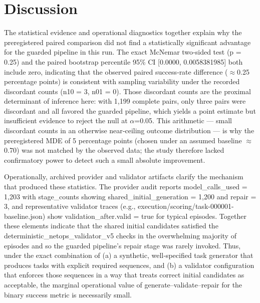 \documentclass[conference]{IEEEtran}
\begin{document}
\section{Discussion}
The statistical evidence and operational diagnostics together explain why the preregistered paired comparison did not find a statistically significant advantage for the guarded pipeline in this run. The exact McNemar two‑sided test (p = 0.25) and the paired bootstrap percentile 95\% CI [0.0000, 0.0058381985] both include zero, indicating that the observed paired success‑rate difference (\ensuremath{\approx}0.25 percentage points) is consistent with sampling variability under the recorded discordant counts (n10 = 3, n01 = 0). Those discordant counts are the proximal determinant of inference here: with 1,199 complete pairs, only three pairs were discordant and all favored the guarded pipeline, which yields a point estimate but insufficient evidence to reject the null at \ensuremath{\alpha}=0.05. This arithmetic --- small discordant counts in an otherwise near‑ceiling outcome distribution --- is why the preregistered MDE of 5 percentage points (chosen under an assumed baseline \ensuremath{\approx}0.70) was not matched by the observed data; the study therefore lacked confirmatory power to detect such a small absolute improvement.

Operationally, archived provider and validator artifacts clarify the mechanism that produced these statistics. The provider audit reports model\_calls\_used = 1,203 with stage\_counts showing shared\_initial\_generation = 1,200 and repair = 3, and representative validator traces (e.g., execution/scoring/task-000001-baseline.json) show validation\_after.valid = true for typical episodes. Together these elements indicate that the shared initial candidates satisfied the deterministic\_netops\_validator\_v5 checks in the overwhelming majority of episodes and so the guarded pipeline's repair stage was rarely invoked. Thus, under the exact combination of (a) a synthetic, well‑specified task generator that produces tasks with explicit required sequences, and (b) a validator configuration that enforces those sequences in a way that treats correct initial candidates as acceptable, the marginal operational value of generate--validate--repair for the binary success metric is necessarily small.
\end{document}
